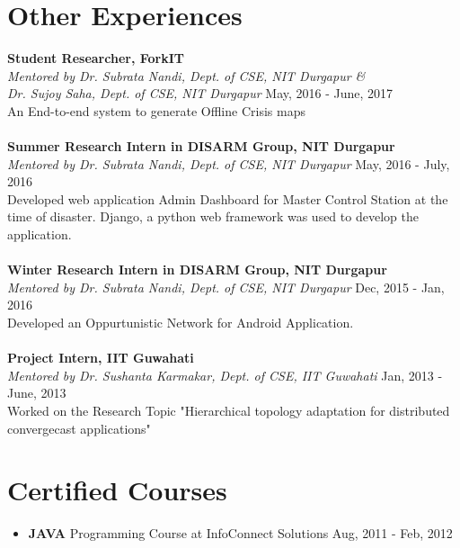 \documentclass[margin, centered]{res}
\begin{document}
\begin{resume}
\section{Other Experiences}
\textbf{Student Researcher, ForkIT} \\
\emph{Mentored by {Dr. Subrata Nandi, Dept. of CSE, NIT Durgapur} \& \\ {Dr. Sujoy Saha, Dept. of CSE, NIT Durgapur}} \hfill May, 2016 - June, 2017 \\
An End-to-end system to generate Offline Crisis maps \\
\\
\textbf{Summer Research Intern in DISARM Group, NIT Durgapur} \\
\emph{Mentored by {Dr. Subrata Nandi, Dept. of CSE, NIT Durgapur}} \hfill May, 2016 - July, 2016 \\
Developed web application Admin Dashboard for Master Control Station at the time of disaster. Django, a python web framework was used to develop the application.\\
\\
\textbf{Winter Research Intern in DISARM Group, NIT Durgapur} \\
\emph{Mentored by {Dr. Subrata Nandi, Dept. of CSE, NIT Durgapur}} \hfill Dec, 2015 - Jan, 2016 \\
Developed an Oppurtunistic Network for Android Application.
\\
\\
\textbf{Project Intern, IIT Guwahati}  \\
\emph{Mentored by {Dr. Sushanta Karmakar, Dept. of CSE, IIT Guwahati}} \hfill Jan, 2013 - June, 2013 \\
Worked on the Research Topic "Hierarchical topology adaptation for distributed convergecast applications"


\section{Certified \hspace{2mm} Courses}
\begin{itemize}[leftmargin=*]
\item \textbf{JAVA} Programming Course at InfoConnect Solutions \hfill Aug, 2011 - Feb, 2012 \\
\end{itemize}

\end{resume}
\end{document}
